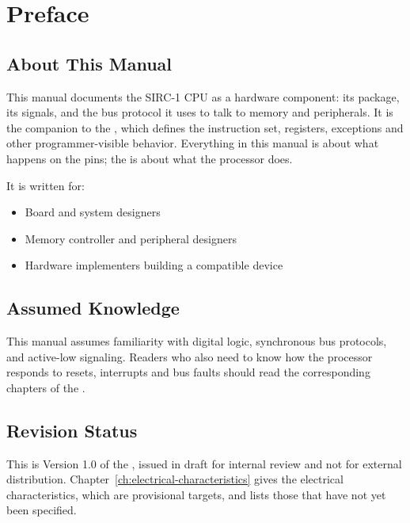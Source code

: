 \chapter*{Preface}
\label{ch:preface}

\section*{About This Manual}

This manual documents the SIRC-1 CPU as a hardware component: its package, its signals, and the bus protocol it uses to
talk to memory and peripherals. It is the companion to the \archmanual{}, which defines the instruction set, registers,
exceptions and other programmer-visible behavior. Everything in this manual is about what happens on the pins; the
\archmanual{} is about what the processor does.

It is written for:

\begin{itemize}
	\item Board and system designers
	\item Memory controller and peripheral designers
	\item Hardware implementers building a compatible device
\end{itemize}

\section*{Assumed Knowledge}

This manual assumes familiarity with digital logic, synchronous bus protocols, and active-low signaling. Readers who
also need to know how the processor responds to resets, interrupts and bus faults should read the corresponding
chapters of the \archmanual{}.

\section*{Revision Status}

This is Version 1.0 of the \hwmanual{}, issued in draft for internal review and not for external distribution.
Chapter~\ref{ch:electrical-characteristics} gives the electrical characteristics, which are provisional targets, and
lists those that have not yet been specified.
